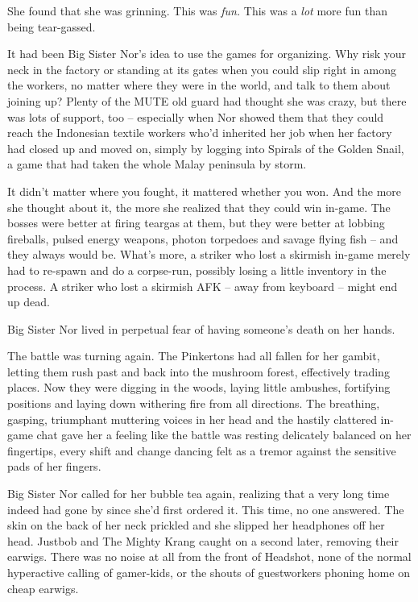 She found that she was grinning. This was \emph{fun.} This was a
\emph{lot} more fun than being tear-gassed.

It had been Big Sister Nor's idea to use the games for organizing.
Why risk your neck in the factory or standing at its gates when you
could slip right in among the workers, no matter where they were in
the world, and talk to them about joining up? Plenty of the MUTE
old guard had thought she was crazy, but there was lots of support,
too -- especially when Nor showed them that they could reach the
Indonesian textile workers who'd inherited her job when her factory
had closed up and moved on, simply by logging into Spirals of the
Golden Snail, a game that had taken the whole Malay peninsula by
storm.

It didn't matter where you fought, it mattered whether you won. And
the more she thought about it, the more she realized that they
could win in-game. The bosses were better at firing teargas at
them, but they were better at lobbing fireballs, pulsed energy
weapons, photon torpedoes and savage flying fish -- and they always
would be. What's more, a striker who lost a skirmish in-game merely
had to re-spawn and do a corpse-run, possibly losing a little
inventory in the process. A striker who lost a skirmish AFK -- away
from keyboard -- might end up dead.

Big Sister Nor lived in perpetual fear of having someone's death on
her hands.

The battle was turning again. The Pinkertons had all fallen for her
gambit, letting them rush past and back into the mushroom forest,
effectively trading places. Now they were digging in the woods,
laying little ambushes, fortifying positions and laying down
withering fire from all directions. The breathing, gasping,
triumphant muttering voices in her head and the hastily clattered
in-game chat gave her a feeling like the battle was resting
delicately balanced on her fingertips, every shift and change
dancing felt as a tremor against the sensitive pads of her
fingers.

Big Sister Nor called for her bubble tea again, realizing that a
very long time indeed had gone by since she'd first ordered it.
This time, no one answered. The skin on the back of her neck
prickled and she slipped her headphones off her head. Justbob and
The Mighty Krang caught on a second later, removing their earwigs.
There was no noise at all from the front of Headshot, none of the
normal hyperactive calling of gamer-kids, or the shouts of
guestworkers phoning home on cheap earwigs.

